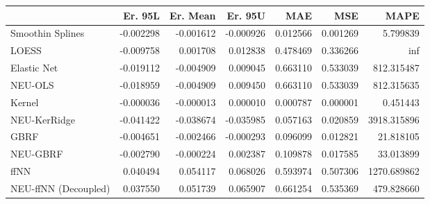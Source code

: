 \begin{tabular}{lrrrrrr}
\toprule
{} &   Er. 95L &  Er. Mean &   Er. 95U &       MAE &       MSE &         MAPE \\
\midrule
Smoothin Splines     & -0.002298 & -0.001612 & -0.000926 &  0.012566 &  0.001269 &     5.799839 \\
LOESS                & -0.009758 &  0.001708 &  0.012838 &  0.478469 &  0.336266 &          inf \\
Elastic Net          & -0.019112 & -0.004909 &  0.009045 &  0.663110 &  0.533039 &   812.315487 \\
NEU-OLS              & -0.018959 & -0.004909 &  0.009450 &  0.663110 &  0.533039 &   812.315635 \\
Kernel               & -0.000036 & -0.000013 &  0.000010 &  0.000787 &  0.000001 &     0.451443 \\
NEU-KerRidge         & -0.041422 & -0.038674 & -0.035985 &  0.057163 &  0.020859 &  3918.315896 \\
GBRF                 & -0.004651 & -0.002466 & -0.000293 &  0.096099 &  0.012821 &    21.818105 \\
NEU-GBRF             & -0.002790 & -0.000224 &  0.002387 &  0.109878 &  0.017585 &    33.013899 \\
ffNN                 &  0.040494 &  0.054117 &  0.068026 &  0.593974 &  0.507306 &  1270.689862 \\
NEU-ffNN (Decoupled) &  0.037550 &  0.051739 &  0.065907 &  0.661254 &  0.535369 &   479.828660 \\
\bottomrule
\end{tabular}
